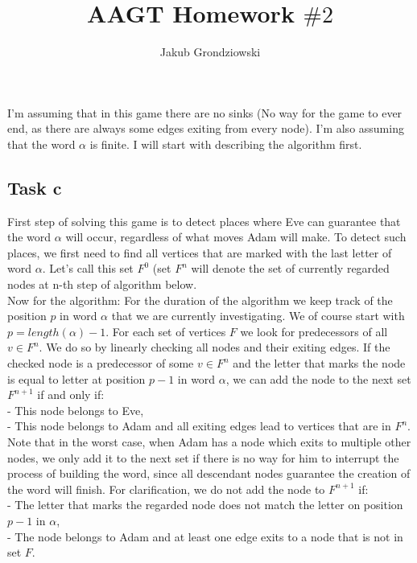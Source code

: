 \documentclass{article}
\title{AAGT Homework $\#2$}
\author{Jakub Grondziowski}
\date{}
\begin{document}
\maketitle

I'm assuming that in this game there are no sinks (No way for the game to ever end, as there are always some edges exiting from every node). I'm also assuming that the word $\alpha$ is finite. I will start with describing the algorithm first.

\subsection*{Task c}
First step of solving this game is to detect places where Eve can guarantee that the word $\alpha$ will occur, regardless of what moves Adam will make. To detect such places, we first need to find all vertices that are marked with the last letter of word $\alpha$. Let's call this set $F^{0}$ (set $F^{n}$  will denote the set of currently regarded nodes at n-th step of algorithm below. \\

Now for the algorithm: For the duration of the algorithm we keep track of the position $p$ in word $\alpha$ that we are currently investigating. We of course start with $p = length(\alpha) - 1$. For each set of vertices $F$ we look for predecessors of all $v \in F^{n}$. We do so by linearly checking all nodes and their exiting edges. If the checked node is a predecessor of some $v \in F^{n}$ and the letter that marks the node is equal to letter at position $p-1$ in word $\alpha$, we can add the node to the next set $F^{n+1}$ if and only if: \\
- This node belongs to Eve, \\
- This node belongs to Adam and all exiting edges lead to vertices that are in $F^{n}$. \\

Note that in the worst case, when Adam has a node which exits to multiple other nodes, we only add it to the next set if there is no way for him to interrupt the process of building the word, since all descendant nodes guarantee the creation of the word will finish. For clarification, we do not add the node to $F^{n+1}$ if: \\
- The letter that marks the regarded node does not match the letter on position $p-1$ in $\alpha$, \\
- The node belongs to Adam and at least one edge exits to a node that is not in set $F$. \\
\end{document}
